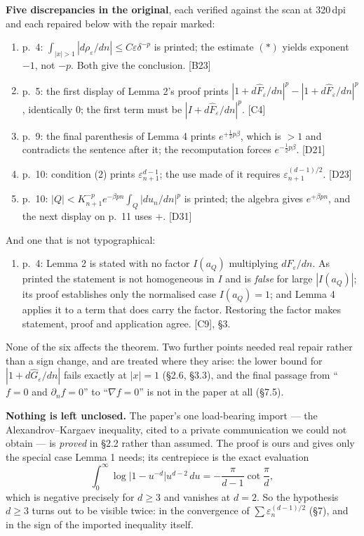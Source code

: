 \documentclass[11pt,reqno]{amsart}
\theoremstyle{plain}
\theoremstyle{definition}
\theoremstyle{plain}
\theoremstyle{definition}
\theoremstyle{remark}
\newcommand{\he}[1]{\widehat{#1}}
\newcommand{\Ftil}{\widehat{F}_\varepsilon}
\newcommand{\Ledger}[1]{{\scriptsize\textsf{[#1]}}}
\begin{document}
\medskip
\noindent\textbf{Five discrepancies in the original}, each verified against the scan
at 320\,dpi and each repaired below with the repair marked:
\begin{enumerate}[label=(\roman*),leftmargin=2.2em]
\item p.~4: $\int_{|x|>1}|d\rho_\varepsilon/dn|\le C\varepsilon\delta^{-p}$ is
  printed; the estimate $(*)$ yields exponent $-1$, not $-p$. Both give the
  conclusion. \Ledger{B23}
\item p.~5: the first display of Lemma 2's proof prints
  $|1+d\Ftil/dn|^p-|1+d\Ftil/dn|^p$, identically $0$; the first term must be
  $|I+d\Ftil/dn|^p$. \Ledger{C4}
\item p.~9: the final parenthesis of Lemma 4 prints $e^{+\frac12p\beta}$, which is
  $>1$ and contradicts the sentence after it; the recomputation forces
  $e^{-\frac12p\beta}$. \Ledger{D21}
\item p.~10: condition (2) prints $\varepsilon_{n+1}^{d-1}$; the use made of it
  requires $\varepsilon_{n+1}^{(d-1)/2}$. \Ledger{D23}
\item p.~10: $|Q|<K_{n+1}^{-p}e^{-\beta pn}\int_Q|du_n/dn|^p$ is printed; the
  algebra gives $e^{+\beta pn}$, and the next display on p.~11 uses $+$.
  \Ledger{D31}
\end{enumerate}
\smallskip
\noindent And one that is not typographical:
\begin{enumerate}[label=(\roman*),leftmargin=2.2em,start=6]
\item p.~4: Lemma 2 is stated with no factor $I(a_Q)$ multiplying
  $dF_\varepsilon/dn$. As printed the statement is not homogeneous in $I$ and is
  \emph{false} for large $|I(a_Q)|$; its proof establishes only the normalised case
  $I(a_Q)=1$; and Lemma 4 applies it to a term that does carry the factor. Restoring
  the factor makes statement, proof and application agree. \Ledger{C9}, \S3.
\end{enumerate}

\smallskip
None of the six affects the theorem. Two further points needed real repair rather
than a sign change, and are treated where they arise: the lower bound for
$|1+d\he G_\varepsilon/dn|$ fails exactly at $|x|=1$ (\S2.6, \S3.3), and the final
passage from ``$f=0$ and $\partial_nf=0$'' to ``$\nabla f=0$'' is not in the paper
at all (\S7.5).

\medskip
\noindent\textbf{Nothing is left unclosed.} The paper's one load-bearing import --- the
Alexandrov--Kargaev inequality, cited to a private communication we could not obtain
--- is \emph{proved} in \S2.2 rather than assumed. The proof is ours and gives only
the special case Lemma 1 needs; its centrepiece is the exact evaluation
\[\int_0^\infty\log\bigl|1-u^{-d}\bigr|u^{d-2}\,du=-\frac{\pi}{d-1}\cot\frac{\pi}{d},\]
which is negative precisely for $d\ge3$ and vanishes at $d=2$. So the hypothesis
$d\ge3$ turns out to be visible twice: in the convergence of $\sum\varepsilon_n^{(d-1)/2}$
(\S7), and in the sign of the imported inequality itself.
\end{document}
